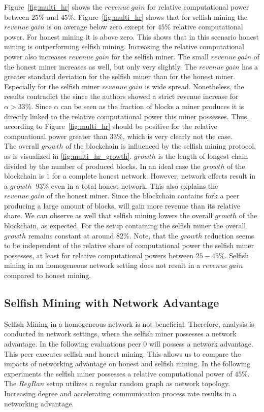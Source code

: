 Figure~\ref{fig:multi_hr} shows the $revenue~gain$ for relative computational power between $25\% $ and $45\% $. Figure~\ref{fig:multi_hr} shows that for selfish mining the $revenue~gain$ is on average below zero except for $45\% $ relative computational power. For honest mining it is above zero. This shows that in this scenario honest mining is outperforming selfish mining. Increasing the relative computational power also increases $revenue~gain$ for the selfish miner. The small $revenue~gain$ of the honest miner increases as well, but only very slightly. The $revenue~gain$ has a greater standard deviation for the selfish miner than for the honest miner. Especially for the selfish miner $revenue~gain$ is wide spread. Nonetheless, the results contradict the  since the authors showed a strict revenue increase for $\alpha > 33\% $. Since $\alpha$ can be seen as the fraction of blocks a miner produces it is directly linked to the relative computational power this miner possesses. Thus, according to  Figure~\ref{fig:multi_hr} should be positive for the relative compuational power greater than $33\% $, which is very clearly not the case.\\
The overall $growth$ of the blockchain is influenced by the selfish mining protocol, as is visualized in \ref{fig:multi_hr_growth}. $growth$ is the length of longest chain divided by the number of produced blocks. In an ideal case the $growth$ of the blockchain is $1$ for a complete honest network. However, network effects result in a $growth$ $~93\% $ even in a total honest network. This also explains the $revenue~gain$ of the honest miner. Since the blockchain contains fork a peer producing a large amount of blocks, will gain more revenue than its relative share. We can observe as well that selfish mining lowers the overall $growth$ of the blockchain, as expected. For the setup containing the selfish miner the overall $growth$ remains constant at around $82\% $. Note, that the $growth$ reduction seems to be independent of the relative share of computational power the selfish miner possesses, at least for relative computational powers between $25-45\% $.
Selfish mining in an homogeneous network setting does not result in a $revenue~gain$ compared to honest mining.

\subsection{Selfish Mining with Network Advantage}
Selfish Mining in a homogeneous network is not beneficial. Therefore, analysis is conducted in network settings, where the selfish miner possesses a network advantage. In the following evaluations peer $0$ will possess a network advantage. This peer executes selfish and honest mining. This allows us to compare the impacts of networking advantage on honest and selfish mining. In the following experiments the selfish miner possesses a relative computational power of $45\% $.
The $RegRan$ setup utilizes a regular random graph as network topology. Increasing degree and accelerating communication process rate results in a networking advantage. 

